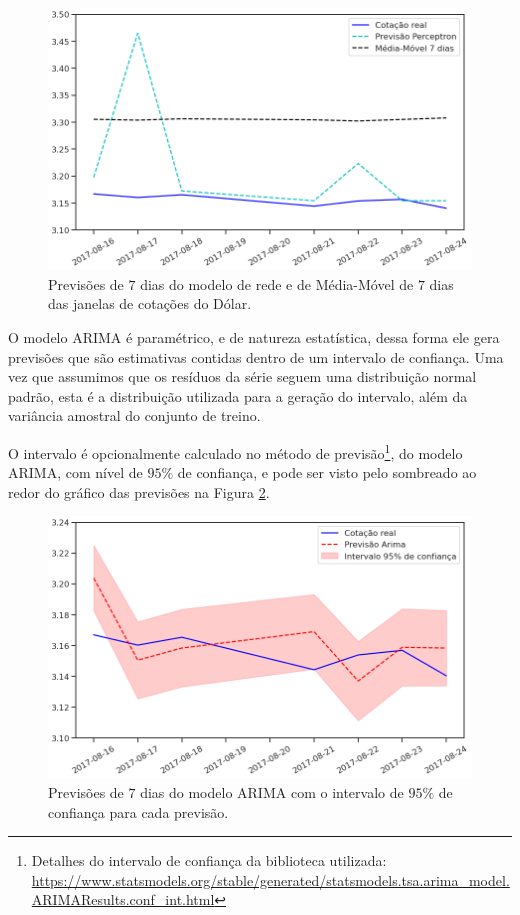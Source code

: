 \begin{figure}[htb]
\centering
\includegraphics[width=13.1cm]{figuras/series_previsoes_7_2}
\caption{Previsões de $7$ dias do modelo de rede  e de Média-Móvel de $7$ dias das janelas de cotações do Dólar.}
\label{fig:series_previsoes_7_2}
\end{figure}

O modelo ARIMA é paramétrico, e de natureza estatística, dessa forma ele gera previsões que são estimativas contidas dentro de um intervalo de confiança. Uma vez que assumimos que os resíduos da série seguem uma distribuição normal padrão, esta é a distribuição utilizada para a geração do intervalo, além da variância amostral do conjunto de treino.

O intervalo é opcionalmente calculado no método de previsão\footnote{Detalhes do intervalo de confiança da biblioteca utilizada: \url{https://www.statsmodels.org/stable/generated/statsmodels.tsa.arima_model.ARIMAResults.conf_int.html}}, do modelo ARIMA, com nível de $95\%$ de confiança, e pode ser visto pelo sombreado ao redor do gráfico das previsões na Figura \ref{fig:series_previsoes_7_3}.

\begin{figure}[htb]
\centering
\includegraphics[width=13.1cm]{figuras/series_previsoes_7_3}
\caption{Previsões de $7$ dias do modelo ARIMA com o intervalo de $95\%$ de confiança para cada previsão.}
\label{fig:series_previsoes_7_3}
\end{figure}


